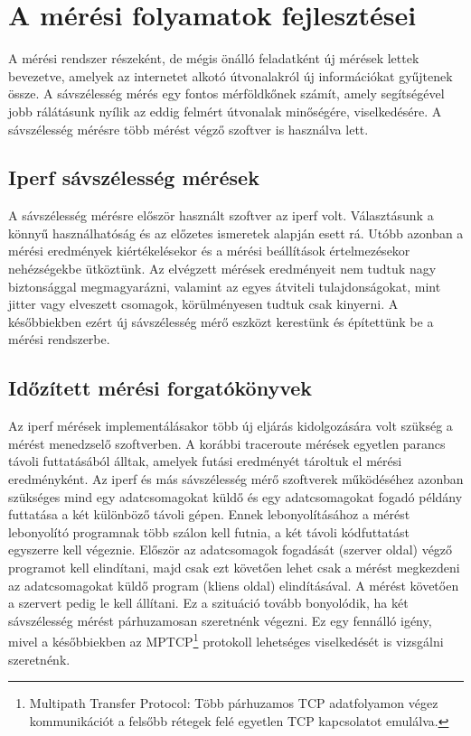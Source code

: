 \chapter{A mérési folyamatok fejlesztései}
A mérési rendszer részeként, de mégis önálló feladatként új mérések lettek bevezetve, amelyek az internetet alkotó útvonalakról új információkat gyűjtenek össze. A sávszélesség mérés egy fontos mérföldkőnek számít, amely segítségével jobb rálátásunk nyílik az eddig felmért útvonalak minőségére, viselkedésére. A sávszélesség mérésre több mérést végző szoftver is használva lett.


\section{Iperf sávszélesség mérések}
A sávszélesség mérésre először használt szoftver az iperf volt. Választásunk a könnyű használhatóság és az előzetes ismeretek alapján esett rá. Utóbb azonban a mérési eredmények kiértékelésekor és a mérési beállítások értelmezésekor nehézségekbe ütköztünk. Az elvégzett mérések eredményeit nem tudtuk nagy biztonsággal megmagyarázni, valamint az egyes átviteli tulajdonságokat, mint jitter vagy elveszett csomagok, körülményesen tudtuk csak kinyerni. A későbbiekben ezért új sávszélesség mérő eszközt kerestünk és építettünk be a mérési rendszerbe.


\section{Időzített mérési forgatókönyvek}
Az iperf mérések implementálásakor több új eljárás kidolgozására volt szükség a mérést menedzselő szoftverben. A korábbi traceroute mérések egyetlen parancs távoli futtatásából álltak, amelyek futási eredményét tároltuk el mérési eredményként. Az iperf és más sávszélesség mérő szoftverek működéséhez azonban szükséges mind egy adatcsomagokat küldő és egy adatcsomagokat fogadó példány futtatása a két különböző távoli gépen. Ennek lebonyolításához a mérést lebonyolító programnak több szálon kell futnia, a két távoli kódfuttatást egyszerre kell végeznie. Először az adatcsomagok fogadását (szerver oldal) végző programot kell elindítani, majd csak ezt követően lehet csak a mérést megkezdeni az adatcsomagokat küldő program (kliens oldal) elindításával. A mérést követően a szervert pedig le kell állítani. Ez a szituáció tovább bonyolódik, ha két sávszélesség mérést párhuzamosan szeretnénk végezni. Ez egy fennálló igény, mivel a későbbiekben az MPTCP\footnote{Multipath Transfer Protocol: Több párhuzamos TCP adatfolyamon végez kommunikációt a felsőbb rétegek felé egyetlen TCP kapcsolatot emulálva.} protokoll lehetséges viselkedését is vizsgálni szeretnénk.

